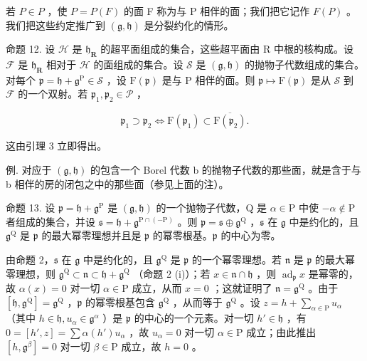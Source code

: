 若 \(P \in P\) ，使 \(P = P(F)\) 的面 F 称为与 P 相伴的面；我们把它记作 \(F(P)\) 。我们把这些约定推广到 \((\mathfrak{g}, \mathfrak{h})\) 是分裂约化的情形。

命题 12. 设 \(\mathcal{H}\) 是 \(\mathfrak{h}_{\mathbf{R}}\) 的超平面组成的集合，这些超平面由 R 中根的核构成。设 \(\mathcal{F}\) 是 \(\mathfrak{h}_{\mathbf{R}}\) 相对于 \(\mathcal{H}\) 的面组成的集合。设 \(\mathcal{S}\) 是 \((\mathfrak{g},\mathfrak{h})\) 的抛物子代数组成的集合。对每个 \(\mathfrak{p} = \mathfrak{h} + \mathfrak{g}^{\mathrm{P}}\in \mathcal{S}\) ，设 \(\mathrm{F}(\mathfrak{p})\) 是与 P 相伴的面。则 \(\mathfrak{p}\mapsto \mathrm{F}(\mathfrak{p})\) 是从 \(\mathcal{S}\) 到 \(\mathcal{F}\) 的一个双射。若 \(\mathfrak{p}_1,\mathfrak{p}_2\in \mathcal{P}\) ，

\[
\mathfrak {p} _ {1} \supset \mathfrak {p} _ {2} \Longleftrightarrow \mathrm{F} (\mathfrak {p} _ {1}) \subset \overline {{\mathrm{F} (\mathfrak {p} _ {2})}}.
\]

这由引理 3 立即得出。

例. 对应于 \((\mathfrak{g}, \mathfrak{h})\) 的包含一个 Borel 代数 b 的抛物子代数的那些面，就是含于与 b 相伴的房的闭包之中的那些面（参见上面的注）。

命题 13. 设 \(\mathfrak{p} = \mathfrak{h} + \mathfrak{g}^{\mathrm{P}}\) 是 \((\mathfrak{g},\mathfrak{h})\) 的一个抛物子代数，Q 是 \(\alpha \in \mathrm{P}\) 中使 \(-\alpha \notin \mathrm{P}\) 者组成的集合，并设 \(\mathfrak{s} = \mathfrak{h} + \mathfrak{g}^{\mathrm{P}\cap (-\mathrm{P})}\) 。则 \(\mathfrak{p} = \mathfrak{s} \oplus \mathfrak{g}^{\mathrm{Q}}\) ，\(\mathfrak{s}\) 在 \(\mathfrak{g}\) 中是约化的，且 \(\mathfrak{g}^{\mathrm{Q}}\) 是 \(\mathfrak{p}\) 的最大幂零理想并且是 \(\mathfrak{p}\) 的幂零根基。\(\mathfrak{p}\) 的中心为零。

由命题 2，\(\mathfrak{s}\) 在 \(\mathfrak{g}\) 中是约化的，且 \(\mathfrak{g}^{\mathrm{Q}}\) 是 \(\mathfrak{p}\) 的一个幂零理想。若 \(\mathfrak{n}\) 是 \(\mathfrak{p}\) 的最大幂零理想，则 \(\mathfrak{g}^{\mathrm{Q}} \subset \mathfrak{n} \subset \mathfrak{h} + \mathfrak{g}^{\mathrm{Q}}\) （命题 2 (i)）；若 \(x \in \mathfrak{n} \cap \mathfrak{h}\) ，则 \(\operatorname{ad}_{\mathfrak{p}} x\) 是幂零的，故 \(\alpha(x) = 0\) 对一切 \(\alpha \in \mathrm{P}\) 成立，从而 \(x = 0\) ；这就证明了 \(\mathfrak{n} = \mathfrak{g}^{\mathrm{Q}}\) 。由于 \([\mathfrak{h}, \mathfrak{g}^{\mathrm{Q}}] = \mathfrak{g}^{\mathrm{Q}}\) ，\(\mathfrak{p}\) 的幂零根基包含 \(\mathfrak{g}^{\mathrm{Q}}\) ，从而等于 \(\mathfrak{g}^{\mathrm{Q}}\) 。设 \(z = h + \sum_{\alpha \in \mathrm{P}} u_{\alpha}\) （其中 \(h \in \mathfrak{h}, u_{\alpha} \in \mathfrak{g}^{\alpha}\) ）是 \(\mathfrak{p}\) 的中心的一个元素。对一切 \(h' \in \mathfrak{h}\) ，有 \(0 = [h', z] = \sum \alpha(h')u_{\alpha}\) ，故 \(u_{\alpha} = 0\) 对一切 \(\alpha \in \mathrm{P}\) 成立；由此推出 \([h, \mathfrak{g}^{\beta}] = 0\) 对一切 \(\beta \in \mathrm{P}\) 成立，故 \(h = 0\) 。

